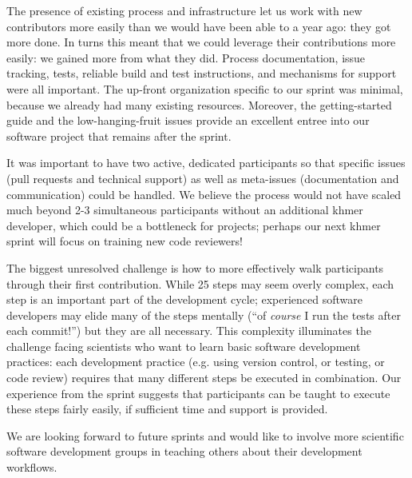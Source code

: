 \documentclass[11pt]{article}
\begin{document}
The presence of existing process and infrastructure let us work with
new contributors more easily than we would have been able to a year
ago: they got more done.  In turns this meant that we could leverage
their contributions more easily: we gained more from what they did.
Process documentation, issue tracking, tests, reliable build and test
instructions, and mechanisms for support were all important.  The
up-front organization specific to our sprint was minimal, because we
already had many existing resources.  Moreover, the getting-started
guide and the low-hanging-fruit issues provide an excellent entree
into our software project that remains after the sprint.

It was important to have two active, dedicated participants so that
specific issues (pull requests and technical support) as well as
meta-issues (documentation and communication) could be handled.  We
believe the process would not have scaled much beyond 2-3 simultaneous
participants without an additional khmer developer, which could be a
bottleneck for projects; perhaps our next khmer sprint will focus on
training new code reviewers!

The biggest unresolved challenge is how to more effectively walk
participants through their first contribution.  While 25 steps may
seem overly complex, each step is an important part of the development
cycle; experienced software developers may elide many of the steps
mentally (``of {\em course} I run the tests after each commit!'') but
they are all necessary.  This complexity illuminates the challenge
facing scientists who want to learn basic software development
practices: each development practice (e.g. using version control, or
testing, or code review) requires that many different steps be
executed in combination.  Our experience from the sprint suggests that
participants can be taught to execute these steps fairly easily, if
sufficient time and support is provided.

We are looking forward to future sprints and would like to involve more
scientific software development groups in teaching others about their
development workflows.


\end{document}
